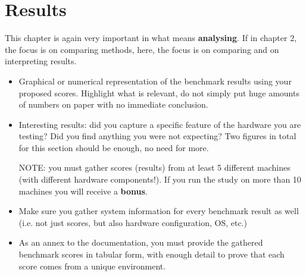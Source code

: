 \chapter{Results}

This chapter is again very important in what means \textbf{analysing}. If in chapter 2, the focus is on comparing methods, here, the focus is on comparing and on interpreting results.

\begin{itemize}
  \item Graphical or numerical representation of the benchmark results using your proposed scores. Highlight what is relevant, do not simply put huge amounts of numbers on paper with no immediate conclusion. 
  
  \item Interesting results: did you capture a specific feature of the hardware you are testing? Did you find anything you were not expecting? Two figures in total for this section should be enough, no need for more.
  
  NOTE: you must gather scores (results) from at least 5 different machines (with different hardware components!). If you run the study on more than 10 machines you will receive a \textbf{bonus}. 
  
  \item Make sure you gather system information for every benchmark result as well (i.e. not just scores, but also hardware configuration, OS, etc.)
  
  \item As an annex to the documentation, you must provide the gathered benchmark scores in tabular form, with enough detail to prove that each score comes from a unique environment.
\end{itemize}






